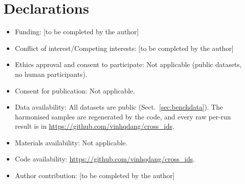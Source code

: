 \documentclass[pdflatex,sn-mathphys-num]{sn-jnl}%
\begin{document}
\backmatter

\section*{Declarations}

\begin{itemize}
\item Funding: [to be completed by the author]
\item Conflict of interest/Competing interests: [to be completed by the author]
\item Ethics approval and consent to participate: Not applicable (public datasets, no human participants).
\item Consent for publication: Not applicable.
\item Data availability: All datasets are public (Sect.~\ref{sec:benchdata}). The harmonised samples are regenerated by the code, and every raw per-run result is in \url{https://github.com/vinhqdang/cross_ids}.
\item Materials availability: Not applicable.
\item Code availability: \url{https://github.com/vinhqdang/cross_ids}.
\item Author contribution: [to be completed by the author]
\end{itemize}


\end{document}
